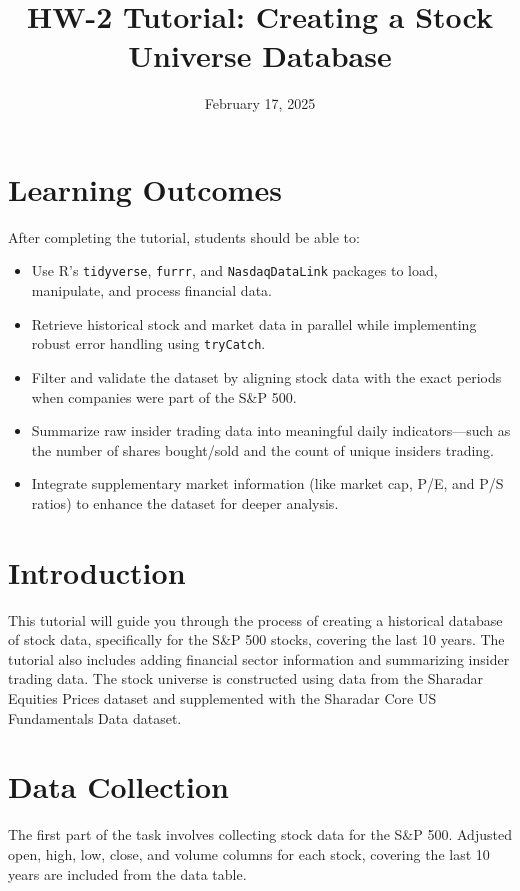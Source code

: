 \documentclass[12pt,letterpaper]{article}
\title{HW-2 Tutorial: Creating a Stock Universe Database}
\date{February 17, 2025}
\begin{document}
\maketitle

\section{Learning Outcomes}

After completing the tutorial, students should be able to:
\begin{itemize}
    \item Use R's \texttt{tidyverse}, \texttt{furrr}, and \texttt{NasdaqDataLink} packages to load, manipulate, and process financial data.
    \item Retrieve historical stock and market data in parallel while implementing robust error handling using \texttt{tryCatch}.
    \item Filter and validate the dataset by aligning stock data with the exact periods when companies were part of the S\&P 500.
    \item Summarize raw insider trading data into meaningful daily indicators---such as the number of shares bought/sold and the count of unique insiders trading.
    \item Integrate supplementary market information (like market cap, P/E, and P/S ratios) to enhance the dataset for deeper analysis.
\end{itemize}

\section{Introduction}
This tutorial will guide you through the process of creating a historical
database of stock data, specifically for the S\&P 500 stocks, covering the last
10 years. The tutorial also includes adding financial sector information and
summarizing insider trading data. The stock universe is constructed using data
from the Sharadar Equities Prices dataset and supplemented with the Sharadar Core US Fundamentals Data dataset.

\section{Data Collection}
The first part of the task involves collecting stock data for the S\&P 500.
Adjusted open, high, low, close, and volume columns for each stock, covering
the last 10 years are included from the data table.
\end{document}

